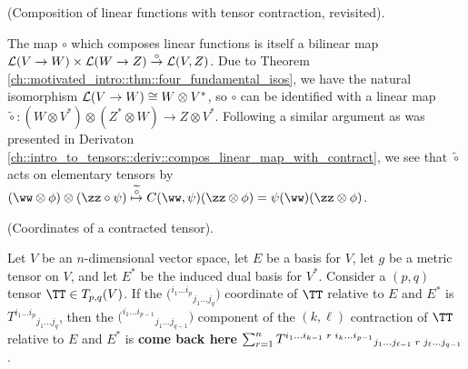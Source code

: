 \begin{remark}
    (Composition of linear functions with tensor contraction, revisited). 
    
    The map $\circ$ which composes linear functions is itself a bilinear map ${\mathcal{L}(V \rightarrow W) \times \mathcal{L}(W \rightarrow Z) \overset{\circ}{\rightarrow} \mathcal{L}(V, Z)}$. Due to Theorem \ref{ch::motivated_intro::thm::four_fundamental_isos}, we have the natural isomorphism $\mathcal{L}(V \rightarrow W) \cong W \otimes V^*$, so $\circ$ can be identified with a linear map $\widetilde{\circ}:(W \otimes V^*) \otimes (Z^* \otimes W) \rightarrow Z \otimes V^*$. Following a similar argument as was presented in Derivaton \ref{ch::intro_to_tensors::deriv::compos_linear_map_with_contract}, we see that $\widetilde{\circ}$ acts on elementary tensors by $(\ww \otimes \phi) \otimes (\zz \circ \psi) \overset{\widetilde{\circ}}{\mapsto} C(\ww, \psi) (\zz \otimes \phi) = \psi(\ww) (\zz \otimes \phi)$.
\end{remark}

\begin{theorem}
    (Coordinates of a contracted tensor).

    Let $V$ be an $n$-dimensional vector space, let $E$ be a basis for $V$, let $g$ be a metric tensor on $V$, and let $E^*$ be the induced dual basis for $V^*$. Consider a $(p, q)$ tensor $\TT \in T_{p,q}(V)$. If the $\Big( {}^{i_1 ... i_p}{}_{j_1 ... j_q} \Big)$ coordinate of $\TT$ relative to $E$ and $E^*$ is $T^{i_1 ... i_p}{}_{j_1 ... j_q}$, then the $\Big( ^{i_1 ... i_{p - 1}}{}_{j_1 ... j_{q - 1}} \Big)$ component of the $(k, \ell)$ contraction of $\TT$ relative to $E$ and $E^*$ is \textbf{come back here} $\sum_{r = 1}^n T^{i_1 ... i_{k - 1} \text{ } r \text{ } i_k ... i_{p - 1}}{}_{j_1 ... j_{\ell - 1} \text{ } r \text{ } j_{\ell} ... j_{q - 1}}$.
\end{theorem}

